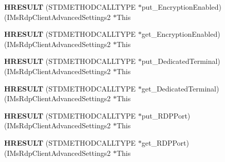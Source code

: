 \begin{DoxyCompactItemize}
\mbox{\label{struct_i_ms_rdp_client_advanced_settings2_vtbl_aa7116bee0005c8d651933f45fc99cc12}} 
{\bfseries H\+R\+E\+S\+U\+LT} (S\+T\+D\+M\+E\+T\+H\+O\+D\+C\+A\+L\+L\+T\+Y\+PE $\ast$put\+\_\+\+Encryption\+Enabled)(I\+Ms\+Rdp\+Client\+Advanced\+Settings2 $\ast$This
\item 
\mbox{\label{struct_i_ms_rdp_client_advanced_settings2_vtbl_acf48db7be64a34c35e027c29a03757f2}} 
{\bfseries H\+R\+E\+S\+U\+LT} (S\+T\+D\+M\+E\+T\+H\+O\+D\+C\+A\+L\+L\+T\+Y\+PE $\ast$get\+\_\+\+Encryption\+Enabled)(I\+Ms\+Rdp\+Client\+Advanced\+Settings2 $\ast$This
\item 
\mbox{\label{struct_i_ms_rdp_client_advanced_settings2_vtbl_ada4b8222371ddf351b7896e8bf7d8fa0}} 
{\bfseries H\+R\+E\+S\+U\+LT} (S\+T\+D\+M\+E\+T\+H\+O\+D\+C\+A\+L\+L\+T\+Y\+PE $\ast$put\+\_\+\+Dedicated\+Terminal)(I\+Ms\+Rdp\+Client\+Advanced\+Settings2 $\ast$This
\item 
\mbox{\label{struct_i_ms_rdp_client_advanced_settings2_vtbl_a0259f4bf22be9ab6017f8adaba579d08}} 
{\bfseries H\+R\+E\+S\+U\+LT} (S\+T\+D\+M\+E\+T\+H\+O\+D\+C\+A\+L\+L\+T\+Y\+PE $\ast$get\+\_\+\+Dedicated\+Terminal)(I\+Ms\+Rdp\+Client\+Advanced\+Settings2 $\ast$This
\item 
\mbox{\label{struct_i_ms_rdp_client_advanced_settings2_vtbl_a40471ac7fd87bfda5c8315178ff4d2cd}} 
{\bfseries H\+R\+E\+S\+U\+LT} (S\+T\+D\+M\+E\+T\+H\+O\+D\+C\+A\+L\+L\+T\+Y\+PE $\ast$put\+\_\+\+R\+D\+P\+Port)(I\+Ms\+Rdp\+Client\+Advanced\+Settings2 $\ast$This
\item 
\mbox{\label{struct_i_ms_rdp_client_advanced_settings2_vtbl_aaeeb1bfb2dce037a987fdd7cd19804e0}} 
{\bfseries H\+R\+E\+S\+U\+LT} (S\+T\+D\+M\+E\+T\+H\+O\+D\+C\+A\+L\+L\+T\+Y\+PE $\ast$get\+\_\+\+R\+D\+P\+Port)(I\+Ms\+Rdp\+Client\+Advanced\+Settings2 $\ast$This
\item 
\mbox{\label{struct_i_ms_rdp_client_advanced_settings2_vtbl_aa0e1dac924b691d903c1f310a83ac948}} 

\end{DoxyCompactItemize}
